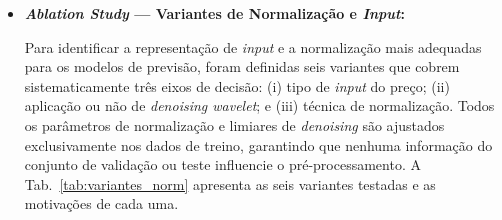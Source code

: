 \begin{itemize}
    O \textit{target} é a variável que o modelo precisa prever, funcionando como a resposta correta que o algoritmo deve aprender a identificar. Para cada dia $t$, o target $y_{t+1}$ indica a direção do preço no dia seguinte: 1 se o preço subir, 0 se cair. O target é sempre calculado a partir do preço \textit{Close} original, sem aplicar nenhum pré-processamento (como DWT ou normalização). Isso evita vazamento de informação: o rótulo de saída permanece puro e independente das transformações aplicadas às \textit{features} de entrada.

    \item \textbf{\textit{Ablation Study} --- Variantes de Normalização e \textit{Input}:}

    Para identificar a representação de \textit{input} e a normalização mais adequadas para os modelos de previsão, foram definidas seis variantes que cobrem sistematicamente três eixos de decisão: (i) tipo de \textit{input} do preço; (ii) aplicação ou não de \textit{denoising wavelet}; e (iii) técnica de normalização. Todos os parâmetros de normalização e limiares de \textit{denoising} são ajustados exclusivamente nos dados de treino, garantindo que nenhuma informação do conjunto de validação ou teste influencie o pré-processamento. A Tab.~\ref{tab:variantes_norm} apresenta as seis variantes testadas e as motivações de cada uma.


\end{itemize}
